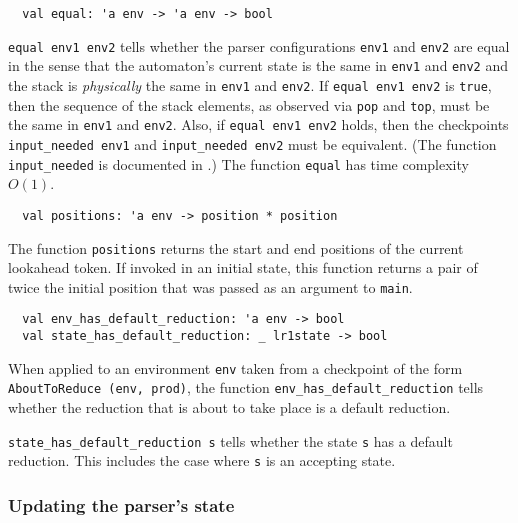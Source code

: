 \documentclass[onecolumn,11pt,nocopyrightspace,preprint]{sigplanconf}
\begin{document}

\begin{verbatim}
  val equal: 'a env -> 'a env -> bool
\end{verbatim}

\verb+equal env1 env2+ tells whether the parser configurations \verb+env1+ and
\verb+env2+ are equal in the sense that the automaton's current state is the
same in \verb+env1+ and \verb+env2+ and the stack is \emph{physically} the
same in \verb+env1+ and \verb+env2+. If \verb+equal env1 env2+ is \verb+true+,
then the sequence of the stack elements, as observed via \verb+pop+ and
\verb+top+, must be the same in \verb+env1+ and \verb+env2+. Also, if
\verb+equal env1 env2+ holds, then the checkpoints \verb+input_needed env1+
and \verb+input_needed env2+ must be equivalent. (The function
\verb+input_needed+ is documented in .)
The function \verb+equal+ has time complexity $O(1)$.


\begin{verbatim}
  val positions: 'a env -> position * position
\end{verbatim}

The function \verb+positions+ returns the start and end positions of the
current lookahead token. If invoked in an initial state, this function returns
a pair of twice the initial position that was passed as an argument
to \verb+main+.


\begin{verbatim}
  val env_has_default_reduction: 'a env -> bool
  val state_has_default_reduction: _ lr1state -> bool
\end{verbatim}

When applied to an environment \verb+env+ taken from a checkpoint of the form
\verb+AboutToReduce (env, prod)+, the function
\verb+env_has_default_reduction+ tells whether the reduction that is about to
take place is a default reduction.

\verb+state_has_default_reduction s+ tells whether the state \verb+s+ has a default
reduction. This includes the case where \verb+s+ is an accepting state.


\subsubsection{Updating the parser's state}
\label{sec:incremental:updating}
\end{document}
